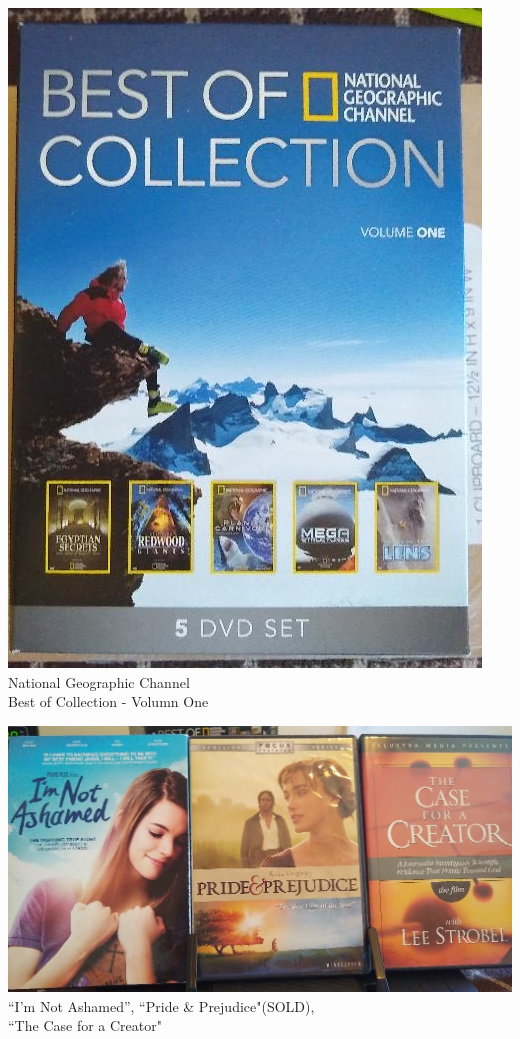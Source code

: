 \documentclass[t]{beamer}
\newcommand{\htarget}[2]{\hypertarget{#1}{#2}}
\begin{document}
\begin{frame}\htarget{geography}{} \begin{center}
\includegraphics[height=0.8\textheight]{dvd01_mini.jpg} \\
National Geographic Channel \\
Best of Collection - Volumn One
\end{center} \end{frame}
\begin{frame}\htarget{case}{} \begin{center}
\includegraphics[width=\textwidth]{dvd02_mini.jpg} \\
``I'm Not Ashamed'', ``Pride \& Prejudice"(SOLD), \\
``The Case for a Creator"
\end{center} \end{frame}
\end{document}
